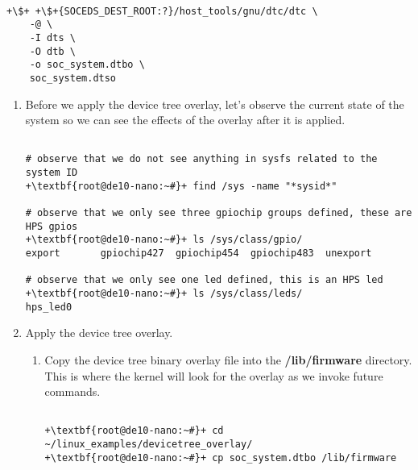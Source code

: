 \begin{flushleft}
\begin{verbatim}

+\$+ +\$+{SOCEDS_DEST_ROOT:?}/host_tools/gnu/dtc/dtc \
	-@ \
	-I dts \
	-O dtb \
	-o soc_system.dtbo \
	soc_system.dtso

\end{verbatim}

\begin{enumerate}[
	label=\textbf{Step \arabic*.},
	leftmargin=*,
	widest={00},
	align=left]

\newpage

\item Before we apply the device tree overlay, let's observe the current state of the system so we can see the effects of the overlay after it is applied.

\begin{verbatim}

# observe that we do not see anything in sysfs related to the system ID
+\textbf{root@de10-nano:~#}+ find /sys -name "*sysid*"

# observe that we only see three gpiochip groups defined, these are HPS gpios
+\textbf{root@de10-nano:~#}+ ls /sys/class/gpio/
export       gpiochip427  gpiochip454  gpiochip483  unexport

# observe that we only see one led defined, this is an HPS led
+\textbf{root@de10-nano:~#}+ ls /sys/class/leds/
hps_led0

\end{verbatim}

\item Apply the device tree overlay.

\begin{enumerate}[
	label=\textbf{Step \arabic{enumi}\alph*.},
	leftmargin=*,
	align=left]

\item Copy the device tree binary overlay file into the \textbf{/lib/firmware} directory.  This is where the kernel will look for the overlay as we invoke future commands.

\begin{verbatim}

+\textbf{root@de10-nano:~#}+ cd ~/linux_examples/devicetree_overlay/
+\textbf{root@de10-nano:~#}+ cp soc_system.dtbo /lib/firmware

\end{verbatim}


\end{enumerate}
\end{enumerate}
\end{flushleft}
